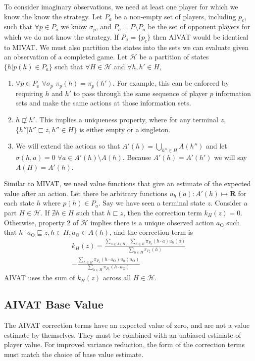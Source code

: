 \documentclass[letterpaper]{article}
\def\VAT{AIVAT}
\begin{document}
To consider imaginary observations, we need at least one player for
which we know the know the strategy. Let $P_a$ be a non-empty set of
players, including $p_c$, such that $\forall p \in P_a$ we know
$\sigma_p$, and $P_o = P \setminus P_a$ be the set of opponent players
for which we do not know the strategy. If $P_a = \{p_c\}$ then \VAT{}
would be identical to MIVAT. We must also partition the states into
the sets we can evaluate given an observation of a completed game. Let
$\mathcal{H}$ be a partition of states $\{ h | p(h) \in P_a\}$ such
that $\forall H \in \mathcal{H}$ and $\forall h,h' \in H$,
\begin{enumerate}
\item $\forall p \in P_o$ $\forall \sigma_p$ $\pi_p(h) =
  \pi_p(h')$. For example, this can be enforced by requiring $h$ and
  $h'$ to pass through the same sequence of player $p$ information
  sets and make the same actions at those information sets.
\item $h \not \sqsubset h'$. This implies a uniqueness property, where
  for any terminal $z$, $\{ h'' | h'' \sqsubset z, h'' \in H\}$ is
  either empty or a singleton.
\item We will extend the actions so that $A'(h) = \bigcup_{h''
  \in H} A(h'')$ and let $\sigma(h,a)=0$ $\forall a \in
  A'(h) \setminus A(h)$. Because $A'(h)=A'(h')$ we will say
  $A(H)=A'(h)$.
\end{enumerate}

Similar to MIVAT, we need value functions that give an estimate of the
expected value after an action. Let there be arbitrary functions
$u_h(a):A'(h)\mapsto\mathbf{R}$ for each state $h$ where $p(h) \in
P_a$. Say we have seen a terminal state $z$. Consider a part $H \in
\mathcal{H}$. If $\nexists h \in H$ such that $h \sqsubset z$, then
the correction term $k_H(z)=0$. Otherwise, property 2 of $\mathcal{H}$
implies there is a unique observed action $a_\text{O}$ such that
$h \cdot a_\text{O} \sqsubseteq z, h \in H, a_\text{O} \in A(h)$, and
the correction term is
\begin{align*}
k_H(z)=
\frac{\sum_{a \in A(H)} \sum_{h \in H} \pi_{P_a}(h \cdot a)u_h(a)}
{\sum_{h \in H} \pi_{P_a}(h)} \\
- \frac{\sum_{h \in H}\pi_{P_a}(h \cdot a_\text{O})u_h(a_\text{O})}
{\sum_{h \in H} \pi_{P_a}(h \cdot a_\text{O})}
\end{align*}
\VAT{} uses the sum of $k_H(z)$ across all $H \in \mathcal{H}$.


\subsection{\VAT{} Base Value}
The \VAT{} correction terms have an expected value of zero, and are
not a value estimate by themselves. They must be combined with an
unbiased estimate of player value. For improved variance reduction,
the form of the correction terms must match the choice of base value
estimate.
\end{document}
